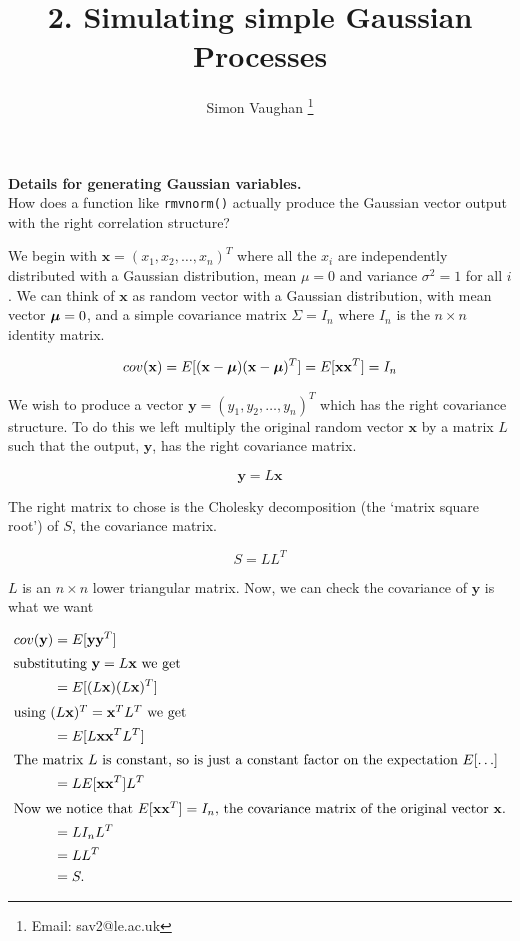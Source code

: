 \documentclass[a4paper, 11pt, amsmath]{article}\usepackage[]{graphicx}\usepackage[]{color}
\def\bmu{{\mbox{\boldmath $\mu$}}}
\begin{document}
\title{2. Simulating simple Gaussian Processes}
\author{Simon Vaughan \thanks{Email: sav2@le.ac.uk}}
\maketitle

\textbf{Details for generating Gaussian variables.} \\

How does a function like {\tt rmvnorm()} actually produce the Gaussian vector output with the right correlation structure?

We begin with $\mathbf{x} = ( x_1, x_2, \ldots, x_n )^T$ where all the $x_i$ are independently distributed with a Gaussian distribution, mean $\mu=0$ and variance $\sigma^2=1$ for all $i$. We can think of $\mathbf{x}$ as random vector with a Gaussian distribution, with mean vector $\bmu = 0$, and a simple covariance matrix $\Sigma = I_n$ where $I_n$ is the $n \times n$ identity matrix. 

\begin{equation}
 cov(\mathbf{x}) = E[(\mathbf{x}-\bmu)(\mathbf{x}-\bmu)^T] = E[\mathbf{x} \mathbf{x}^T] = I_n
\end{equation}

We wish to produce a vector $\mathbf{y} = (y_1, y_2, \ldots, y_n )^T$ which has the right covariance structure. To do this we left multiply the original random vector $\mathbf{x}$ by a matrix $L$ such that the output, $\mathbf{y}$, has the right covariance matrix. 

\begin{equation}
 \mathbf{y} = L \mathbf{x}
\end{equation}

The right matrix to chose is the Cholesky decomposition (the `matrix square root') of $S$, the covariance matrix. 

\begin{equation}
  S = L L^T
\end{equation}

$L$ is an $n \times n$ lower triangular matrix. Now, we can check the covariance of $\mathbf{y}$ is what we want

\begin{align}
  cov(\mathbf{y}) & = E[ \mathbf{y} \mathbf{y}^T  ]  \\
  \intertext{substituting $\mathbf{y} = L \mathbf{x}$ we get}
                  & = E[ (L \mathbf{x})  (L \mathbf{x})^T ]  \\
  \intertext{using $(L \mathbf{x})^T = \mathbf{x}^T L^T$ we get}
                  & = E[ L \mathbf{x} \mathbf{x}^T L^T ]   \\
  \intertext{The matrix $L$ is constant, so is just a constant factor on the expectation $E[\ldots]$}
                  & = L E[ \mathbf{x}  \mathbf{x}^T] L^T  \\
  \intertext{Now we notice that $E[ \mathbf{x}  \mathbf{x}^T] = I_n$, the covariance matrix of the original vector $\mathbf{x}$.}
                  & = L I_n L^T \\
                  & = L L^T \\
                  & = S.
\end{align}
\end{document}
